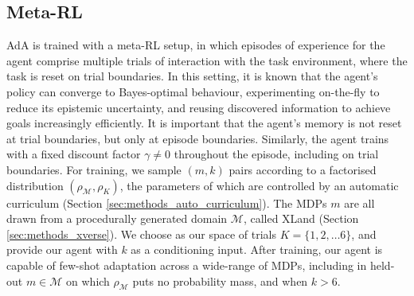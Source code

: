 \documentclass[11pt, a4paper, logo, copyright]{deepmind}
\begin{document}
\begin{appendix}
\subsection{Meta-RL}\label{appendix:metarl}
AdA is trained with a meta-RL setup, in which episodes of experience for the agent comprise multiple trials of interaction with the task environment, where the task is reset on trial boundaries. In this setting, it is known that the agent's policy can converge to Bayes-optimal behaviour, experimenting on-the-fly to reduce its epistemic uncertainty, and reusing discovered information to achieve goals increasingly efficiently. It is important that the agent's memory is not reset at trial boundaries, but only at episode boundaries. Similarly, the agent trains with a fixed discount factor $\gamma \neq 0$ throughout the episode, including on trial boundaries. For training, we sample $(m, k)$ pairs according to a factorised distribution $(\rho_{\mathcal{M}}, \rho_K)$, the parameters of which are controlled by an automatic curriculum (Section \ref{sec:methods_auto_curriculum}). The MDPs $m$ are all drawn from a procedurally generated domain $\mathcal{M}$, called XLand (Section \ref{sec:methods_xverse}). We choose as our space of trials $K = \{1,2, \dots 6\}$, and provide our agent with $k$ as a conditioning input. After training, our agent is capable of few-shot adaptation across a wide-range of MDPs, including in held-out $m \in \mathcal{M}$ on which $\rho_{\mathcal{M}}$ puts no probability mass, and when $k > 6$.

\end{appendix}
\end{document}
